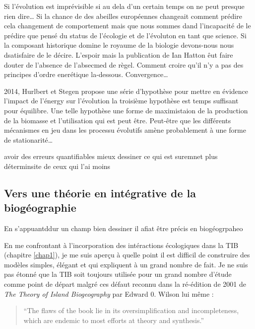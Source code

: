 Si l'évolution est imprévisible si au dela d'un certain temps on ne peut
presque rien dire\ldots{} Si la chance de des abeilles européennes
changeait comment prédire cela changement de comportement mais que nous
sommes dand l'incapacité de le prédire que pensé du status de l'écologie
et de l'évoluton en tant que science. Si la composant historique domine
le royaume de la biologie devons-nous nous dsatisfaire de le décire.
L'espoir mais la publication de Ian Hatton êut faire douter de l'absence
de l'absecmed de règel. Comment croire qu'il n'y a pas des principes
d'ordre enerétique la-dessous. Convergence\ldots{}

2014, Hurlbert et Stegen propose une série d'hypothèse pour mettre en
évidence l'impact de l'énergy sur l'évolution la troisième hypothèse est
temps suffisant pour équilibre. Une telle hypothèse une forme de
maximistaion de la production de la biomasse et l'utilisation qui est
peut être. Peut-être que les différents mécanismes en jeu dans les
processu évolutifs amène probablement à une forme de
stationarité\ldots{}

avoir des erreurs quantifiables mieux dessiner ce qui est suremnet plus
déterminsite de ceux qui l'ai moins

\subsection*{Vers une théorie en intégrative de la
biogéographie}\label{vers-une-thuxe9orie-en-intuxe9grative-de-la-bioguxe9ographie}

En s'appuantddur un champ bien dessiner il afiat être précis en
biogéogrpaheo

En me confrontant à l'incorporation des intéractions écologiques dans la
TIB (chapitre \ref{chap1}), je me suis aperçu à quelle point il est
difficil de construire des modèles simples, élégant et qui expliquent à
un grand nombre de fait. Je ne suis pas étonné que la TIB soit toujours
utilisée pour un grand nombre d'étude comme point de départ malgré ces
défaut reconnu dans la ré-édition de 2001 de \emph{The Theory of Island
Biogeography} par Edward 0. Wilson lui même :

\begin{quote}
``The flaws of the book lie in its oversimplification and
incompleteness, which are endemic to most efforts at theory and
synthesis.''
\end{quote}

